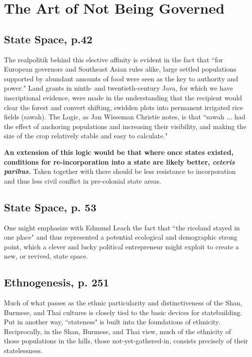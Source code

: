 \documentclass[12pt]{article}
\begin{document}
\section{The Art of Not Being Governed \citep{Scott2009}}

\subsection{State Space, p.42}

The realpolitik behind this elective affinity is evident in the fact that ``for
European governors and Southeast Asian rules alike, large settled populations
supported by abundant amounts of food were seen as the key to authority and
power." Land grants in ninth- and twentieth-century Java, for which we have
inscriptional evidence, were made in the understanding that the recipient would
clear the forest and convert shifting, swidden plots into permanent irrigated
rice fields (sawah). The Logic, as Jan Wisseman Christie notes, is that ``sawah
... had the effect of anchoring populations and increasing their visibility, and
making the size of the crop relatively stable and easy to calculate."

\textbf{An extension of this logic would be that where once states existed,
conditions for re-incorporation into a state are likely better, \textit{ceteris
paribus.}} Taken together with \citet{Ying_2020} there should be less resistance
to incorporation and thus less civil conflict in pre-colonial state areas.

\subsection{State Space, p. 53}

One might emphasize with Edmund Leach the fact that ``the riceland stayed in one
place" and thus represented a potential ecological and demographic strong
point, which a clever and lucky political entrepreneur might exploit to create a
new, or revived, state space.

\subsection{Ethnogenesis, p. 251}

Much of what passes as the ethnic particularity and distinctiveness of the
Shan, Burmese, and Thai cultures is closely tied to the basic devices for
statebuilding. Put in another way, ``stateness" is built into the foundations
of ethnicity. Reciprocally, in the Shan, Burmese, and Thai view, much of the
ethnicity of those populations in the hills, those not-yet-gathered-in,
consists precisely of their statelessness. 
\end{document}
